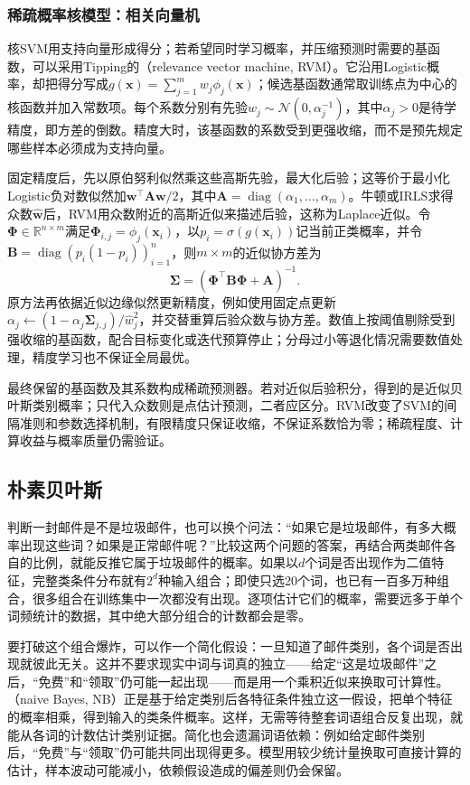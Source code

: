 \subsubsection{稀疏概率核模型：相关向量机}
\label{sec:classification-rvm}

核SVM用支持向量形成得分；若希望同时学习概率，并压缩预测时需要的基函数，可以采用Tipping的（relevance vector machine, RVM）。它沿用Logistic概率，却把得分写成$g(\bm x)=\sum_{j=1}^m w_j\phi_j(\bm x)$；候选基函数通常取训练点为中心的核函数并加入常数项。每个系数分别有先验$w_j\sim\mathcal N(0,\alpha_j^{-1})$，其中$\alpha_j>0$是待学精度，即方差的倒数。精度大时，该基函数的系数受到更强收缩，而不是预先规定哪些样本必须成为支持向量。

固定精度后，先以原伯努利似然乘这些高斯先验，最大化后验；这等价于最小化Logistic负对数似然加$\bm w^\top\bm A\bm w/2$，其中$\bm A=\operatorname{diag}(\alpha_1,\ldots,\alpha_m)$。牛顿或IRLS求得众数$\hat{\bm w}$后，RVM用众数附近的高斯近似来描述后验，这称为Laplace近似。令$\bm\Phi\in\mathbb R^{n\times m}$满足$\bm\Phi_{i,j}=\phi_j(\bm x_i)$，以$p_i=\sigma(g(\bm x_i))$记当前正类概率，并令$\bm B=\operatorname{diag}(p_i(1-p_i))_{i=1}^n$，则$m\times m$的近似协方差为
\[
  \bm\Sigma=(\bm\Phi^\top\bm B\bm\Phi+\bm A)^{-1}.
\]
原方法再依据近似边缘似然更新精度，例如使用固定点更新$\alpha_j\leftarrow(1-\alpha_j\bm\Sigma_{j,j})/\hat w_j^2$，并交替重算后验众数与协方差。数值上按阈值剔除受到强收缩的基函数，配合目标变化或迭代预算停止；分母过小等退化情况需要数值处理，精度学习也不保证全局最优。

最终保留的基函数及其系数构成稀疏预测器。若对近似后验积分，得到的是近似贝叶斯类别概率；只代入众数则是点估计预测，二者应区分。RVM改变了SVM的间隔准则和参数选择机制，有限精度只保证收缩，不保证系数恰为零；稀疏程度、计算收益与概率质量仍需验证。

\subsection{朴素贝叶斯}
\label{sec:classification-naive-bayes}

判断一封邮件是不是垃圾邮件，也可以换个问法：“如果它是垃圾邮件，有多大概率出现这些词？如果是正常邮件呢？”比较这两个问题的答案，再结合两类邮件各自的比例，就能反推它属于垃圾邮件的概率。如果以$d$个词是否出现作为二值特征，完整类条件分布就有$2^d$种输入组合；即使只选20个词，也已有一百多万种组合，很多组合在训练集中一次都没有出现。逐项估计它们的概率，需要远多于单个词频统计的数据，其中绝大部分组合的计数都会是零。

要打破这个组合爆炸，可以作一个简化假设：一旦知道了邮件类别，各个词是否出现就彼此无关。这并不要求现实中词与词真的独立——给定“这是垃圾邮件”之后，“免费”和“领取”仍可能一起出现——而是用一个乘积近似来换取可计算性。（naive Bayes, NB）正是基于给定类别后各特征条件独立这一假设，把单个特征的概率相乘，得到输入的类条件概率。这样，无需等待整套词语组合反复出现，就能从各词的计数估计类别证据。简化也会遗漏词语依赖：例如给定邮件类别后，“免费”与“领取”仍可能共同出现得更多。模型用较少统计量换取可直接计算的估计，样本波动可能减小，依赖假设造成的偏差则仍会保留。

